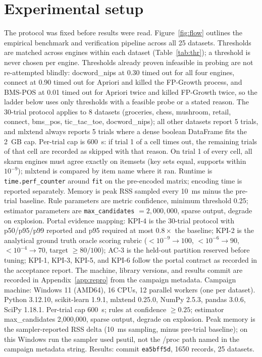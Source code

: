 \documentclass[twocolumn,10pt]{article}
\begin{document}
\section{Experimental setup}
\label{sec:setup}
The protocol was fixed before results were read. Figure~\ref{fig:flow} outlines the empirical benchmark and verification pipeline across all 25 datasets. Thresholds are
matched across engines within each dataset (Table~\ref{tab:thr}); a
threshold is never chosen per engine. Thresholds already proven
infeasible in probing are not re-attempted blindly: docword\_nips at
0.30 timed out for all four engines, connect at 0.90 timed out for
Apriori and killed the FP-Growth process, and BMS-POS at 0.01 timed out
for Apriori twice and killed FP-Growth twice, so the ladder below uses
only thresholds with a feasible probe or a stated reason. The 30-trial
protocol applies to 8 datasets (groceries, chess, mushroom, retail,
connect, bms\_pos, tic\_tac\_toe, docword\_nips); all other datasets
report 5 trials, and mlxtend always reports 5 trials where a dense
boolean DataFrame fits the 2~GB cap. Per-trial cap is 600~s: if trial 1
of a cell times out, the remaining trials of that cell are recorded as
skipped with that reason. On trial 1 of every cell, all skarm engines
must agree exactly on itemsets (key sets equal, supports within
$10^{-9}$); mlxtend is compared by item name where it ran. Runtime is
\texttt{time.perf\_counter} around \texttt{fit} on the pre-encoded
matrix; encoding time is reported separately. Memory is peak RSS
sampled every 10~ms minus the pre-trial baseline. Rule parameters are
metric confidence, minimum threshold 0.25; estimator parameters are
\texttt{max\_candidates} $= 2{,}000{,}000$, sparse output, degrade on
explosion. Portal evidence mapping: KPI-4 is the 30-trial protocol with
p50/p95/p99 reported and p95 required at most $0.8\times$ the
baseline; KPI-2 is the analytical ground truth oracle scoring rubric ($< 10^{-9} \to 100$, $< 10^{-6} \to 90$, $< 10^{-4} \to 70$, target $\ge 80/100$); AC-3 is the held-out partition reserved
before tuning; KPI-1, KPI-3, KPI-5, and KPI-6 follow the portal
contract as recorded in the acceptance report. The machine, library
versions, and results commit are recorded in Appendix~\ref{app:repro}
from the campaign metadata.
Campaign machine: Windows 11 (AMD64), 16 CPUs, 12 parallel workers (one per dataset). Python 3.12.10, scikit-learn 1.9.1, mlxtend 0.25.0, NumPy 2.5.3, pandas 3.0.6, SciPy 1.18.1. Per-trial cap 600~s; rules at confidence $\geq 0.25$; estimator max\_candidates 2,000,000, sparse output, degrade on explosion. Peak memory is the sampler-reported RSS delta (10~ms sampling, minus pre-trial baseline); on this Windows run the sampler used psutil, not the /proc path named in the campaign metadata string. Results: commit \texttt{ea5bff5d}, 1650 records, 25 datasets.
\end{document}
